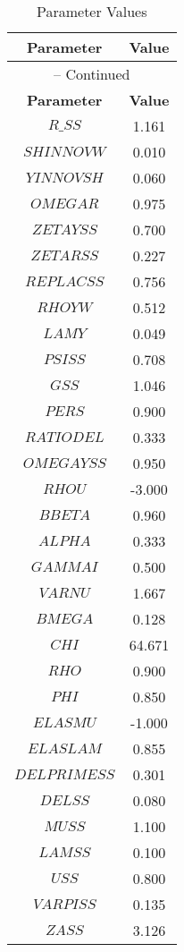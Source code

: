 \begin{center}
\begin{longtable}{cc}
\caption{Parameter Values}\\%
\toprule%
\multicolumn{1}{c}{\textbf{Parameter}} &
\multicolumn{1}{c}{\textbf{Value}}  \\%
\midrule%
\endfirsthead
\multicolumn{2}{c}{{\tablename} \thetable{} -- Continued}\\%
\midrule%
\multicolumn{1}{c}{\textbf{Parameter}} &
\multicolumn{1}{c}{\textbf{Value}} \\%
\midrule%
\endhead
$R\_SS$ 	 & 	 1.161 \\
$SHINNOVW$ 	 & 	 0.010 \\
$YINNOVSH$ 	 & 	 0.060 \\
$OMEGAR$ 	 & 	 0.975 \\
$ZETAYSS$ 	 & 	 0.700 \\
$ZETARSS$ 	 & 	 0.227 \\
$REPLACSS$ 	 & 	 0.756 \\
$RHOYW$ 	 & 	 0.512 \\
$LAMY$ 	 & 	 0.049 \\
$PSISS$ 	 & 	 0.708 \\
$GSS$ 	 & 	 1.046 \\
$PERS$ 	 & 	 0.900 \\
$RATIODEL$ 	 & 	 0.333 \\
$OMEGAYSS$ 	 & 	 0.950 \\
$RHOU$ 	 & 	 -3.000 \\
$BBETA$ 	 & 	 0.960 \\
$ALPHA$ 	 & 	 0.333 \\
$GAMMAI$ 	 & 	 0.500 \\
$VARNU$ 	 & 	 1.667 \\
$BMEGA$ 	 & 	 0.128 \\
$CHI$ 	 & 	 64.671 \\
$RHO$ 	 & 	 0.900 \\
$PHI$ 	 & 	 0.850 \\
$ELASMU$ 	 & 	 -1.000 \\
$ELASLAM$ 	 & 	 0.855 \\
$DELPRIMESS$ 	 & 	 0.301 \\
$DELSS$ 	 & 	 0.080 \\
$MUSS$ 	 & 	 1.100 \\
$LAMSS$ 	 & 	 0.100 \\
$USS$ 	 & 	 0.800 \\
$VARPISS$ 	 & 	 0.135 \\
$ZASS$ 	 & 	 3.126 \\

\end{longtable}
\end{center}
